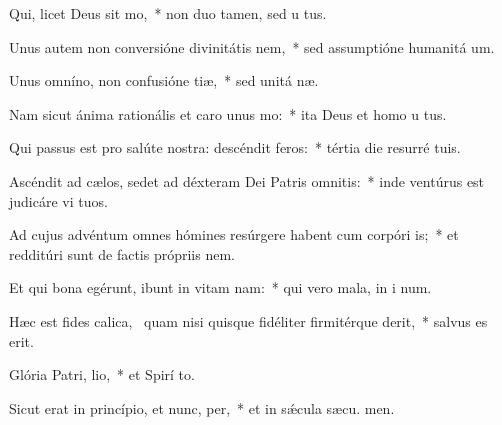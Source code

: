 \item Qui, licet Deus sit  mo,~* non duo tamen, sed u  tus.
\item Unus autem non conversióne divinitátis  nem,~* sed assumptióne humanitá  um.
\item Unus omníno, non confusióne tiæ,~* sed unitá næ.
\item Nam sicut ánima rationális et caro unus  mo:~* ita Deus et homo u  tus.
\item Qui passus est pro salúte nostra: descéndit  feros:~* tértia die resurré  tuis.
\item Ascéndit ad cælos, sedet ad déxteram Dei Patris omnitis:~* inde ventúrus est judicáre vi  tuos.
\item Ad cujus advéntum omnes hómines resúrgere habent cum corpóri is;~* et redditúri sunt de factis própriis nem.
\item Et qui bona egérunt, ibunt in vitam nam:~* qui vero mala, in i num.
\item Hæc est fides calica,~\pscross{} quam nisi quisque fidéliter firmitérque derit,~* salvus es  erit.
\item Glória Patri,  lio,~* et Spirí to.
\item Sicut erat in princípio, et nunc,  per,~* et in sǽcula sæcu. men.
